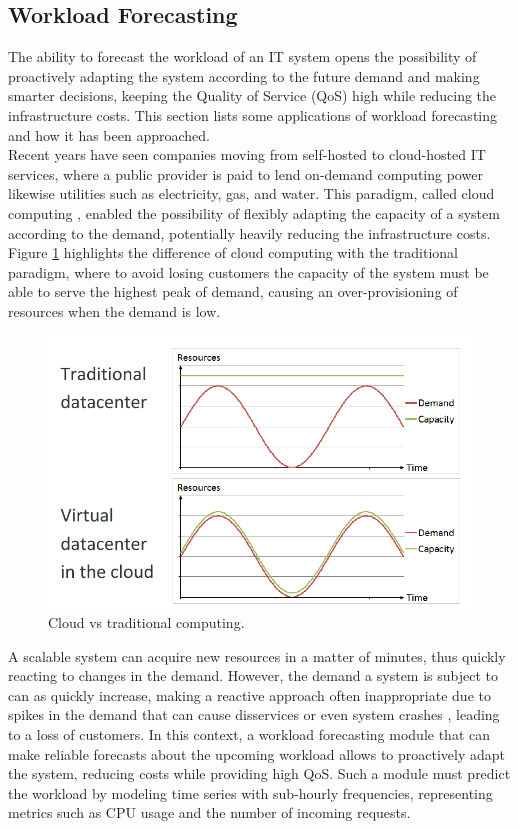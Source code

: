 \documentclass[a4paper, 12pt]{article} %
\begin{document}
	\subsection{Workload Forecasting } \label{ssec:workload_forecasting}
	The ability to forecast the workload of an IT system opens the possibility of proactively adapting the system according to the future demand and making smarter decisions, keeping the Quality of Service (QoS) high while reducing the infrastructure costs. This section lists some applications of workload forecasting and how it has been approached.\\
	Recent years have seen companies moving from self-hosted to cloud-hosted  IT services, where a public provider is paid to lend on-demand computing power likewise utilities such as electricity, gas, and water. This paradigm, called cloud computing \cite{CloudComputing}, enabled the possibility of flexibly adapting the capacity of a system according to the demand, potentially heavily reducing the infrastructure costs.  Figure \ref{fig:cloud_vs_traditional_computing} highlights the difference of cloud computing with the traditional paradigm, where to avoid losing customers the capacity of the system must be able to serve the highest peak of demand, causing an over-provisioning of resources when the demand is low.\\
	\begin{figure}
		\includegraphics[width=\linewidth]{img/cloud_vs_traditional_computing.png}
		\caption{Cloud vs traditional computing.}
		\label{fig:cloud_vs_traditional_computing}
	\end{figure}
	A scalable system can acquire new resources in a matter of minutes, thus quickly reacting to changes in the demand. However, the demand a system is subject to can as quickly increase, making a reactive approach often inappropriate due to spikes in the demand that can cause disservices or even system crashes \cite{ArimaWorkloadPrediction}, leading to a loss of customers. In this context, a workload forecasting module that can make reliable forecasts about the upcoming workload allows to proactively adapt the system, reducing costs while providing high QoS. Such a module must predict the workload by modeling time series with sub-hourly frequencies, representing metrics such as CPU usage and the number of incoming requests.\\
\end{document}

